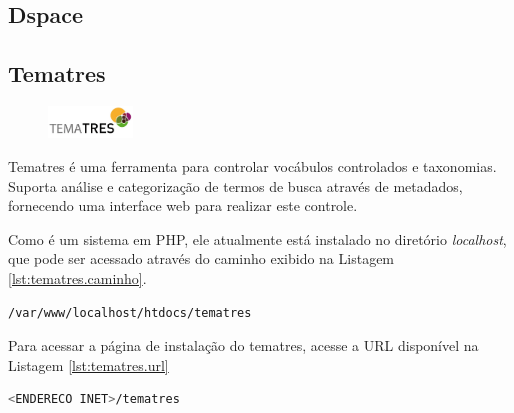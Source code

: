 \subsection{Dspace}\label{dspace}

 \blindtext

 \blindtext

 \blindtext

\subsection{Tematres}\label{tematres}

\begin{figure} %
    \centering
    \includegraphics[width=0.2\textwidth]{../images/tematres.jpg}
\end{figure}

Tematres é uma ferramenta para controlar vocábulos controlados e taxonomias. Suporta análise e categorização de termos de busca através de metadados, fornecendo uma interface web para realizar este controle.

Como é um sistema em PHP, ele atualmente está instalado no diretório \textit{localhost}, que pode ser acessado através do caminho exibido na Listagem \ref{lst:tematres.caminho}.
\begin{lstlisting}[language=bash, label=lst:tematres.caminho, caption=Instalação do Tematres.]
    /var/www/localhost/htdocs/tematres
\end{lstlisting}

Para acessar a página de instalação do tematres, acesse a URL disponível na Listagem \ref{lst:tematres.url}
\begin{lstlisting}[language=bash, label=lst:tematres.url, caption=Instalação do Tematres.]
    <ENDERECO INET>/tematres
\end{lstlisting}
